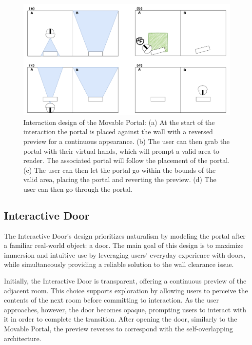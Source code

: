 \begin{figure}[t]
    \centering
     \includegraphics[width=.9\textwidth]{NOVAthesisFiles/Images/schemes/mov-interaction.drawio.pdf}
     \caption[Interaction design of the Movable Portal.]
     {Interaction design of the Movable Portal: (a) At the start of the interaction the portal is placed against the wall with a 
     reversed preview for a continuous appearance. (b) The user can then grab the portal with their virtual hands, which will prompt 
     a valid area to render. The 
     associated portal will follow the placement of the portal. (c) The user can then let the portal go within the bounds of the valid 
     area, placing the portal and reverting the preview. (d) The user can then go through the portal.}
     \label{fig:mov-portal-interaction}
\end{figure}

\subsection{Interactive Door}
\label{sec:int-door-design}

The Interactive Door's design prioritizes naturalism by modeling the portal after a familiar real-world object: a door. The main goal of this design 
is to maximize immersion and intuitive use by leveraging users' everyday experience with doors, while simultaneously providing a reliable solution 
to the wall clearance issue. 

Initially, the Interactive Door is transparent, offering a continuous preview of the adjacent room. This choice supports exploration by allowing 
users to perceive the contents of the next room before committing to interaction. As the user approaches, however, the door becomes opaque, 
prompting users to interact with it in order to complete the transition. After opening the door, similarly to the Movable Portal, the preview 
reverses to correspond with the self-overlapping architecture.

